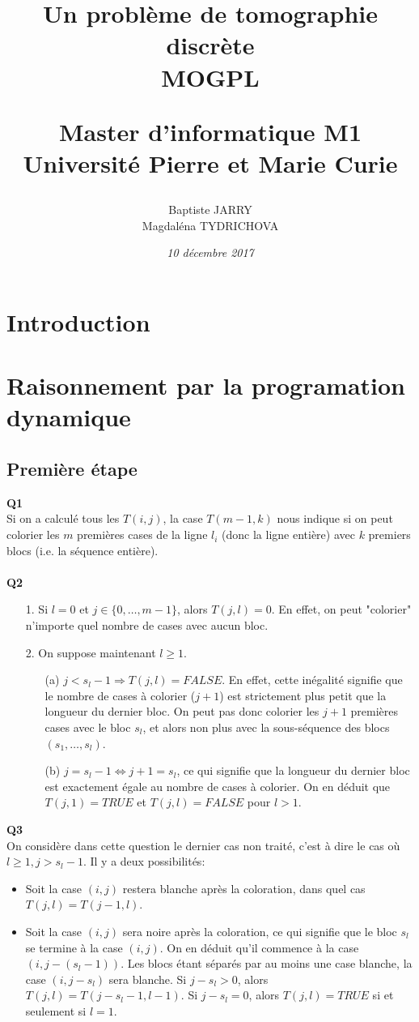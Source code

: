 \documentclass[10pt,a4paper]{article}
\title{%
        \LARGE \textbf {Un problème de tomographie discrète}\\
        \vspace{8mm}
        \large \textbf{MOGPL}\\
        \vspace{10mm}
        \author{Baptiste JARRY \\ Magdaléna TYDRICHOVA}
        \large {Master d'informatique M1}\\
          \vspace{5mm}
        \large {Université Pierre et Marie Curie \vspace{15mm}}\\ 
        \date{\vspace{10mm} \textsf{\textrm{\textit{10 décembre 2017}}}}}
\begin{document}
\maketitle
\thispagestyle{empty}
\newpage
\section*{Introduction}
\newpage
\section{Raisonnement par la programation dynamique}
\subsection{Première étape}
\noindent \textbf{Q1} \\
Si on a calculé tous les $T(i,j)$, la case $T(m-1, k)$ nous indique si on peut colorier les $m$ premières cases de la ligne $l_i$ (donc la ligne entière) avec $k$ premiers blocs (i.e. la séquence entière). \\ \\
\noindent \textbf{Q2}
\begin{itemize}
\item[1.] Si $l = 0$ et $j \in \lbrace 0, \hdots, m-1 \rbrace$, alors $T(j,l) = 0$. En effet, on peut "colorier" n'importe quel nombre de cases avec aucun bloc. \\ 
\item[2.] On suppose maintenant $l \geq 1$.
	\begin{itemize}
		\item[(a)] $j < s_l -1 \Rightarrow T(j,l) = FALSE$. En effet, cette inégalité signifie que le nombre de cases à colorier ($j+1$) est strictement plus petit que la longueur du dernier bloc. On peut pas donc colorier les $j+1$ premières cases avec le bloc $s_l$, et alors non plus avec la sous-séquence des blocs $(s_1, \hdots, s_l)$. 
		\item[(b)] $j = s_l -1 \Leftrightarrow j+1 = s_l$, ce qui signifie que la longueur du dernier bloc est exactement égale au nombre de cases à colorier. On en déduit que $T(j,1) = TRUE$ et $T(j,l) = FALSE$ pour $l > 1$. 
	\end{itemize}
\end{itemize}
\noindent
\textbf{Q3} \\
On considère dans cette question le dernier cas non traité, c'est à dire le cas où $l \geq 1, j > s_l -1$. Il y a deux possibilités: 
\begin{itemize}
	\item Soit la case $(i,j)$ restera blanche après la coloration, dans quel cas $T(j,l) = T(j-1,l)$. 
	\item Soit la case $(i,j)$ sera noire après la coloration, ce qui signifie que le bloc $s_l$ se termine à la case $(i,j)$. On en déduit qu'il commence à la case $(i, j - (s_l -1))$. Les blocs étant séparés par au moins une case blanche, la case $(i, j-s_l)$ sera blanche. Si $j-s_l > 0$, alors $T(j, l) = T(j-s_l -1, l-1)$. Si $j-s_l = 0$, alors $T(j,l) = TRUE$ si et seulement si $l = 1$.  
\end{itemize}  
\end{document}

